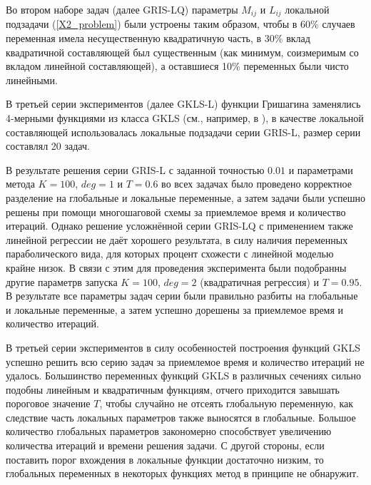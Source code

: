 \documentclass{aip-cp}
\begin{document}
Во втором наборе задач (далее GRIS-LQ) параметры $M_{ij}$ и $L_{ij}$ локальной подзадачи (\ref{X2_problem}) были устроены таким образом, чтобы в 60\% случаев переменная имела несущественную квадратичную часть, в 30\% вклад квадратичной составляющей был существенным (как минимум, соизмеримым со вкладом линейной составляющей), а оставшиеся 10\% переменных были чисто линейными.

В третьей серии экспериментов (далее GKLS-L) функции Гришагина заменялись 4-мерными функциями из класса GKLS (см., например, в \cite{Sergeyev2015,Grishagin2018}), в качестве локальной составляющей использовалась локальные подзадачи серии GRIS-L, размер серии составлял 20 задач.

В результате решения серии GRIS-L с заданной точностью $0.01$ и параметрами метода $K=100$, $deg=1$ и $T=0.6$ во всех задачах было проведено корректное разделение на глобальные и локальные переменные, а затем задачи были успешно решены при помощи многошаговой схемы за приемлемое время и количество итераций. Однако решение усложнённой серии GRIS-LQ с применением также линейной регрессии не даёт хорошего результата, в силу наличия переменных параболического вида, для которых процент схожести с линейной моделью крайне низок. В связи с этим для проведения эксперимента были подобранны другие параметрв запуска $K=100$, $deg=2$ (квадратичная регрессия) и $T=0.95$. В результате все параметры задач серии были правильно разбиты на глобальные и локальные переменные, а затем успешно дорешены за приемлемое время и количество итераций.
 

В третьей серии экспериментов в силу особенностей построения функций GKLS успешно решить всю серию задач за приемлемое время и количество итераций не удалось. Большинство переменных функций GKLS в различных сечениях сильно подобны линейным и квадратичным функциям, отчего приходится завышать пороговое значение $T$, чтобы случайно не отсеять глобальную переменную, как следствие часть локальных параметров также выносятся в глобальные. Большое количество глобальных параметров закономерно способствует увеличению количества итераций и времени решения задачи. С другой стороны, если поставить порог вхождения в локальные функции достаточно низким, то глобальных переменных в некоторых функциях метод в принципе не обнаружит.
\end{document}
